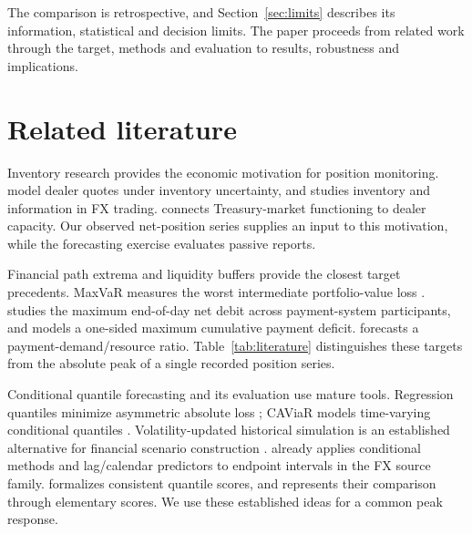 The comparison is retrospective, and Section~\ref{sec:limits} describes its information, statistical and decision limits. The paper proceeds from related work through the target, methods and evaluation to results, robustness and implications.

\section{Related literature}
Inventory research provides the economic motivation for position monitoring. \citet{ho1981} model dealer quotes under inventory uncertainty, and \citet{lyons1995} studies inventory and information in FX trading. \citet{duffie2023} connects Treasury-market functioning to dealer capacity. Our observed net-position series supplies an input to this motivation, while the forecasting exercise evaluates passive reports.

Financial path extrema and liquidity buffers provide the closest target precedents. MaxVaR measures the worst intermediate portfolio-value loss \citep{boudoukh2004}. \citet{petrunia2019} studies the maximum end-of-day net debit across payment-system participants, and \citet{hoogen2017} models a one-sided maximum cumulative payment deficit. \citet{arjani2020} forecasts a payment-demand/resource ratio. Table~\ref{tab:literature} distinguishes these targets from the absolute peak of a single recorded position series.

Conditional quantile forecasting and its evaluation use mature tools. Regression quantiles minimize asymmetric absolute loss \citep{koenker1978}; CAViaR models time-varying conditional quantiles \citep{engle2004}. Volatility-updated historical simulation is an established alternative for financial scenario construction \citep{hull1998,barone1999}. \citet{wisniewski2020} already applies conditional methods and lag/calendar predictors to endpoint intervals in the FX source family. \citet{gneiting2011} formalizes consistent quantile scores, and \citet{ehm2016} represents their comparison through elementary scores. We use these established ideas for a common peak response.



